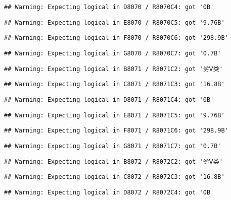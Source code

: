 \documentclass[
]{article}
\begin{document}
\begin{verbatim}
## Warning: Expecting logical in D8070 / R8070C4: got '0B'
\end{verbatim}

\begin{verbatim}
## Warning: Expecting logical in E8070 / R8070C5: got '9.76B'
\end{verbatim}

\begin{verbatim}
## Warning: Expecting logical in F8070 / R8070C6: got '298.9B'
\end{verbatim}

\begin{verbatim}
## Warning: Expecting logical in G8070 / R8070C7: got '0.7B'
\end{verbatim}

\begin{verbatim}
## Warning: Expecting logical in B8071 / R8071C2: got '劣Ⅴ类'
\end{verbatim}

\begin{verbatim}
## Warning: Expecting logical in C8071 / R8071C3: got '16.8B'
\end{verbatim}

\begin{verbatim}
## Warning: Expecting logical in D8071 / R8071C4: got '0B'
\end{verbatim}

\begin{verbatim}
## Warning: Expecting logical in E8071 / R8071C5: got '9.76B'
\end{verbatim}

\begin{verbatim}
## Warning: Expecting logical in F8071 / R8071C6: got '298.9B'
\end{verbatim}

\begin{verbatim}
## Warning: Expecting logical in G8071 / R8071C7: got '0.7B'
\end{verbatim}

\begin{verbatim}
## Warning: Expecting logical in B8072 / R8072C2: got '劣Ⅴ类'
\end{verbatim}

\begin{verbatim}
## Warning: Expecting logical in C8072 / R8072C3: got '16.8B'
\end{verbatim}

\begin{verbatim}
## Warning: Expecting logical in D8072 / R8072C4: got '0B'
\end{verbatim}
\end{document}
